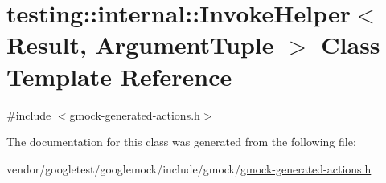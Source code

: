 \hypertarget{classtesting_1_1internal_1_1_invoke_helper}{}\section{testing\+:\+:internal\+:\+:Invoke\+Helper$<$ Result, Argument\+Tuple $>$ Class Template Reference}
\label{classtesting_1_1internal_1_1_invoke_helper}


{\ttfamily \#include $<$gmock-\/generated-\/actions.\+h$>$}



The documentation for this class was generated from the following file\+:\begin{DoxyCompactItemize}
\item 
vendor/googletest/googlemock/include/gmock/\hyperlink{gmock-generated-actions_8h}{gmock-\/generated-\/actions.\+h}\end{DoxyCompactItemize}
